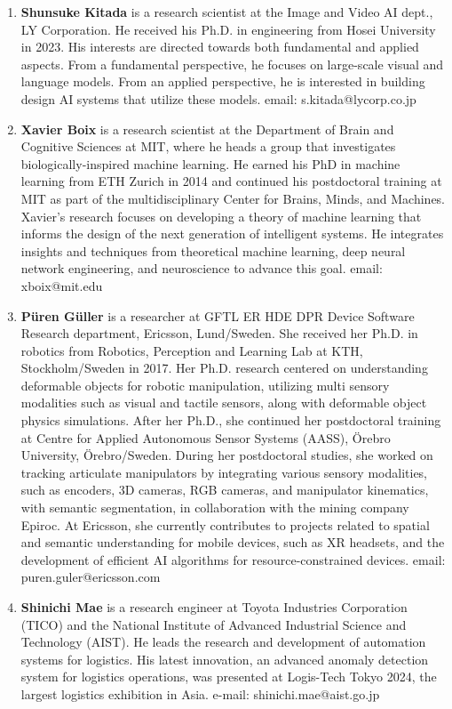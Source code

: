 \documentclass{article}
\begin{document}
\begin{enumerate}
    \item {\bf Shunsuke Kitada} is a research scientist at the Image and Video AI dept., LY Corporation.
    He received his Ph.D. in engineering from Hosei University in 2023. His interests are directed towards both fundamental and applied aspects. 
    From a fundamental perspective, he focuses on large-scale visual and language models. 
    From an applied perspective, he is interested in building design AI systems that utilize these models. email: s.kitada@lycorp.co.jp

    \item {\bf Xavier Boix} is a research scientist at the Department of Brain and Cognitive Sciences at MIT, where he heads a group that investigates biologically-inspired machine learning. He earned his PhD in machine learning from ETH Zurich in 2014 and continued his postdoctoral training at MIT as part of the multidisciplinary Center for Brains, Minds, and Machines. Xavier's research focuses on developing a theory of machine learning that informs the design of the next generation of intelligent systems. He integrates insights and techniques from theoretical machine learning, deep neural network engineering, and neuroscience to advance this goal. email: xboix@mit.edu

    \item {\bf Püren Güller} is a researcher at GFTL ER HDE DPR Device Software Research department, Ericsson, Lund/Sweden. She received her Ph.D. in robotics from Robotics, Perception and Learning Lab at KTH, Stockholm/Sweden in 2017. Her Ph.D. research centered on understanding deformable objects for robotic manipulation, utilizing multi sensory modalities such as visual and tactile sensors, along with deformable object physics simulations. After her Ph.D., she continued her postdoctoral training at Centre for Applied Autonomous Sensor Systems (AASS), Örebro University, Örebro/Sweden. During her postdoctoral studies, she worked on tracking articulate manipulators by integrating various sensory modalities, such as encoders, 3D cameras, RGB cameras, and manipulator kinematics, with semantic segmentation, in collaboration with the mining company Epiroc. At Ericsson, she currently contributes to projects related to spatial and semantic understanding for mobile devices, such as XR headsets, and the development of efficient AI algorithms for resource-constrained devices. email: puren.guler@ericsson.com

    \item {\bf Shinichi Mae} is a research engineer at Toyota Industries Corporation (TICO) and the National Institute of Advanced Industrial Science and Technology (AIST). He leads the research and development of automation systems for logistics. His latest innovation, an advanced anomaly detection system for logistics operations, was presented at Logis-Tech Tokyo 2024, the largest logistics exhibition in Asia. e-mail: shinichi.mae@aist.go.jp


\end{enumerate}
\end{document}

